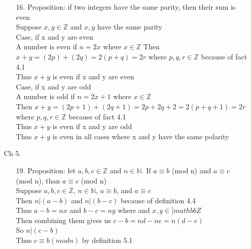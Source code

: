 \documentclass[sigconf]{article}
\begin{document}
\begin{itemize}
\begin{itemize}
      \item[16.]  Proposition: if two integers have the same parity, then their sum is even\\
                  Suppose $x,y\in\mathbb{Z}$ and $x,y$ have the same parity\\
                  Case, if x and y are even\\
                  A number is even if $n=2x$ where $x\in\mathbb{Z}$
                  Then $x+y=(2p)+(2q)=2(p+q)=2r$ where $p,q,r\in\mathbb{Z}$ because of fact 4.1\\
                  Thus $x+y$ is even if x and y are even\\
                  Case, if x and y are odd\\
                  A number is odd if $n=2x+1$ where $x\in\mathbb{Z}$\\
                  Then $x+y=(2p+1)+(2q+1)=2p+2q+2=2(p+q+1)=2r$ where $p,q,r\in\mathbb{Z}$ because of fact 4.1\\
                  Thus $x+y$ is even if x and y are odd\\
                  Thus $x+y$ is even in all cases where x and y have the same polarity
    \end{itemize}
  \item[Ch 5.] \begin{itemize}
      \item[19.]  Proposition: let $a,b,c\in \mathbb{Z}$ and $n\in\mathbb{N}$. If $a\equiv b$ (mod n) and $a\equiv c$ (mod n), than $a\equiv c$ (mod n)\\
                  Suppose $a,b,c\in\mathbb{Z}$, $n\in\mathbb{N}$, $a\equiv b$, and $a\equiv c$\\
                  Then $n|(a-b)$ and $n|(b-c)$ because of definition 4.4\\
                  Thus $a-b=nx$ and $b-c=ny$ where and $x,y\in]mathbb{Z}$\\
                  Then combining them gives us $c-b=nd-ne=n(d-e)$\\
                  So $n|(c-b)$\\
                  Thus $c\equiv b (mod n)$ by definition 5.1



\end{itemize}
\end{itemize}
\end{document}

